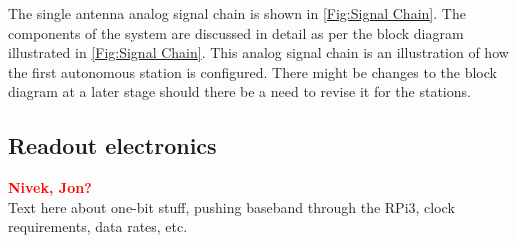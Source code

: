 \documentclass{ws-jai}
\begin{document}
The single antenna analog signal chain is shown in \autoref{Fig:Signal
  Chain}. The components of the system are discussed in detail as per
the block diagram illustrated in \autoref{Fig:Signal Chain}. This
analog signal chain is an illustration of how the first autonomous
station is configured. There might be changes to the block diagram at
a later stage should there be a need to revise it for the stations.


% 

\subsection{Readout electronics}
\textcolor{red}{\bf Nivek, Jon?} \\
Text here about one-bit stuff, pushing baseband through the RPi3,
clock requirements, data rates, etc.
\end{document}
